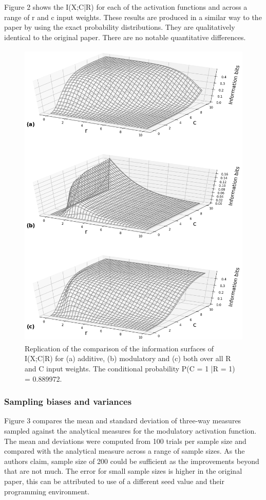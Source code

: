 Figure 2 shows the I(X;C|R) for each of the activation functions and across a range of r and c input weights. These results are produced in a similar way to the paper by using the exact probability distributions. They are qualitatively identical to the original paper. There are no notable quantitative differences. 


\begin{figure}[H]
    \begin{center}
        \includegraphics[width=12cm,height=15cm]{figure_2.png}
    \end{center}
      \caption{Replication of the comparison of the information surfaces of I(X;C|R) for (a) additive, (b) modulatory and (c) both over all R and C input weights. The conditional probability P(C = 1 |R = 1) = 0.889972.}
\end{figure}

\subsubsection{Sampling biases and variances}

Figure 3 compares the mean and standard deviation of three-way measures sampled against the analytical measures for the modulatory activation function. The mean and deviations were computed from 100 trials per sample size and compared with the analytical measure across a range of sample sizes. As the authors claim, sample size of 200 could be sufficient as the improvements beyond that are not much. The error for small sample sizes is higher in the original paper, this can be attributed to use of a different seed value and their programming environment.


